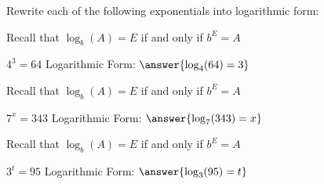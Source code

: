 \documentclass{ximera}
\begin{document}
\begin{example}
\begin{question}
\end{question}


\begin{question}

Rewrite each of the following exponentials into logarithmic form:
\begin{hint}
	Recall that $\log_b(A)=E$ if and only if $b^E=A$
\end{hint}

$4^3=64$ \qquad Logarithmic Form: $\answer{\log_4(64)=3}$ \\

\begin{hint}
	Recall that $\log_b(A)=E$ if and only if $b^E=A$
\end{hint}

$7^x=343$ \qquad Logarithmic Form: $\answer{\log_7(343)=x}$ \\

\begin{hint}
	Recall that $\log_b(A)=E$ if and only if $b^E=A$
\end{hint}

$3^t=95$ \qquad Logarithmic Form: $\answer{\log_3(95)=t}$ \\

\end{question}


\end{example}
\end{document}
